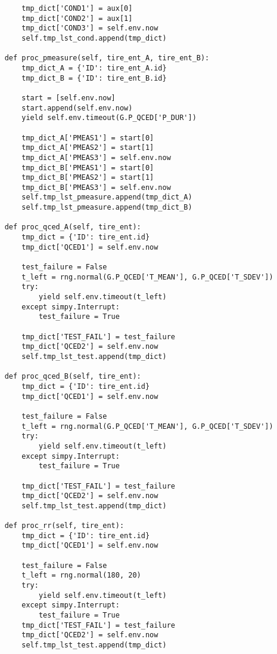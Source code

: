 \begin{verbatim}
        tmp_dict['COND1'] = aux[0]
        tmp_dict['COND2'] = aux[1]
        tmp_dict['COND3'] = self.env.now
        self.tmp_lst_cond.append(tmp_dict)

    def proc_pmeasure(self, tire_ent_A, tire_ent_B):
        tmp_dict_A = {'ID': tire_ent_A.id}
        tmp_dict_B = {'ID': tire_ent_B.id}

        start = [self.env.now]
        start.append(self.env.now)
        yield self.env.timeout(G.P_QCED['P_DUR'])

        tmp_dict_A['PMEAS1'] = start[0]
        tmp_dict_A['PMEAS2'] = start[1]
        tmp_dict_A['PMEAS3'] = self.env.now
        tmp_dict_B['PMEAS1'] = start[0]
        tmp_dict_B['PMEAS2'] = start[1]
        tmp_dict_B['PMEAS3'] = self.env.now
        self.tmp_lst_pmeasure.append(tmp_dict_A)
        self.tmp_lst_pmeasure.append(tmp_dict_B)

    def proc_qced_A(self, tire_ent):
        tmp_dict = {'ID': tire_ent.id}
        tmp_dict['QCED1'] = self.env.now

        test_failure = False
        t_left = rng.normal(G.P_QCED['T_MEAN'], G.P_QCED['T_SDEV'])
        try:
            yield self.env.timeout(t_left)
        except simpy.Interrupt:
            test_failure = True

        tmp_dict['TEST_FAIL'] = test_failure
        tmp_dict['QCED2'] = self.env.now
        self.tmp_lst_test.append(tmp_dict)

    def proc_qced_B(self, tire_ent):
        tmp_dict = {'ID': tire_ent.id}
        tmp_dict['QCED1'] = self.env.now

        test_failure = False
        t_left = rng.normal(G.P_QCED['T_MEAN'], G.P_QCED['T_SDEV'])
        try:
            yield self.env.timeout(t_left)
        except simpy.Interrupt:
            test_failure = True

        tmp_dict['TEST_FAIL'] = test_failure
        tmp_dict['QCED2'] = self.env.now
        self.tmp_lst_test.append(tmp_dict)

    def proc_rr(self, tire_ent):
        tmp_dict = {'ID': tire_ent.id}
        tmp_dict['QCED1'] = self.env.now

        test_failure = False
        t_left = rng.normal(180, 20)
        try:
            yield self.env.timeout(t_left)
        except simpy.Interrupt:
            test_failure = True
        tmp_dict['TEST_FAIL'] = test_failure
        tmp_dict['QCED2'] = self.env.now
        self.tmp_lst_test.append(tmp_dict)


\end{verbatim}

